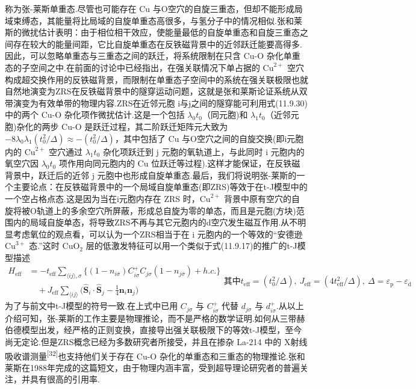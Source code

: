 称为张-莱斯单重态.尽管也可能存在 Cu 与O空穴的自旋三重态，但却不能形成局域束缚态，其能量将比局域的自旋单重态高很多，与氢分子中的情况相似.张和莱斯的微扰估计表明：由于相位相干效应，使能量最低的自旋单重态和自旋三重态之间存在较大的能量间距，它比自旋单重态在反铁磁背景中的近邻跃迁能要高得多.因此，可以忽略单重态与三重态之间的跃迁，将系统限制在只含 Cu-O 杂化单重态的子空间之中.在前面的讨论中已经指出，在强关联情况下单占据的 $\mathrm{Cu}^{2+}$ 空穴构成超交换作用的反铁磁背景，而限制在单重态子空间中的系统在强关联极限也就自然地演变为ZRS在反铁磁背景中的隧穿运动问题，这就是张和莱斯论证系统从双带演变为有效单带的物理内容.ZRS在近邻元胞 i与j之间的隧穿能可利用式(11.9.30)中的两个 Cu-O 杂化项作微扰估计.这是一个包括 $\lambda_{0}t_{0}$（同元胞)和 $\lambda_{1}t_{0}$（近邻元胞)杂化的两步 Cu-O 是跃迁过程，其二阶跃迁矩阵元大致为 $-8\lambda_{0}\lambda_{1}(t_{0}^{2}/\Delta)\approx-(t_{0}^{2}/\Delta)$，其中包括了 Cu 与O空穴之间的自旋交换(即i元胞内的 $\mathrm{Cu}^{2+}$ 空穴通过 $\lambda_{1}t_{0}$ 杂化项跃迁到 j 元胞的氧轨道上，与此同时 i 元胞内的氧空穴因 $\lambda_{0}t_{0}$ 项作用向同元胞内的 Cu 位跃迁等过程).这样才能保证，在反铁磁背景中，跃迁后的近邻 j 元胞中也形成自旋单重态.最后，我们将说明张-莱斯的一个主要论点：在反铁磁背景中的一个局域自旋单重态(即ZRS)等效于在t-J模型中的一个空占格点态.这是因为当在i元胞内存在 ZRS 时，$\mathrm{Cu}^{2+}$ 背景中原有空穴的自旋将被O轨道上的多余空穴所屏蔽，形成总自旋为零的单态，而且是元胞(方块)范围内的局域自旋单态，将导致ZRS不再与其它元胞内的d空穴发生磁互作用.从不明显考虑氧位的观点看，可以认为一个ZRS相当于在 i 元胞内的一个等效的“安德逊 $\mathrm{Cu}^{3+}$ 态.”这时 $\mathrm{CuO_{2}}$ 层的低激发特征可以用一个类似于式(11.9.17)的推广的t-J模型描述
\begin{subequations}
\begin{equation}
\begin{aligned}
  H_{\mathrm{eff}}&=-t_{\mathrm{eff}}\sum_{\langle ij\rangle,\sigma}\bigl\{(1-n_{i\overline{\sigma}})
  C_{i\sigma}^{+}C_{j\sigma}(1-n_{j\overline{\sigma}})+h.c.\bigr\}\\
  &\quad+J_{\mathrm{eff}}\sum_{\langle ij\rangle}\biggl(\hat{\boldsymbol{S}}_{i}\cdot\hat{\boldsymbol{S}}_{j}
  -\frac{1}{4}\boldsymbol{n}_{i}\boldsymbol{n}_{j}\biggr)
\end{aligned}
\end{equation}
其中
\begin{equation}
  t_{\mathrm{eff}}=(t_{0}^{2}/\Delta),\ J_{\mathrm{eff}}=(4t_{\mathrm{eff}}^{2}/\Delta),\ \Delta=\varepsilon_{\mathrm{p}}-\varepsilon_{\mathrm{d}}
\end{equation}
\end{subequations}
为了与前文中t-J模型的符号一致.在上式中已用 $C_{j\sigma}$ 与 $C_{i\sigma}^{+}$ 代替 $d_{j\sigma}$ 与 $d_{i\sigma}^{+}$.从以上介绍可知，张-莱斯的工作主要是物理推论，而不是严格的数学证明.如何从三带赫伯德模型出发，经严格的正则变换，直接导出强关联极限下的等效t-J模型，至今尚无定论.但是ZRS概念已经为多数研究者所接受，并且在掺杂 La-214 中的 X射线吸收谱测量\textsuperscript{[32]}也支持他们关于存在 Cu-O 杂化的单重态和三重态的物理推论.张和莱斯在1988年完成的这篇短文，由于物理内涵丰富，受到超导理论研究者的普遍关注，并具有很高的引用率.

